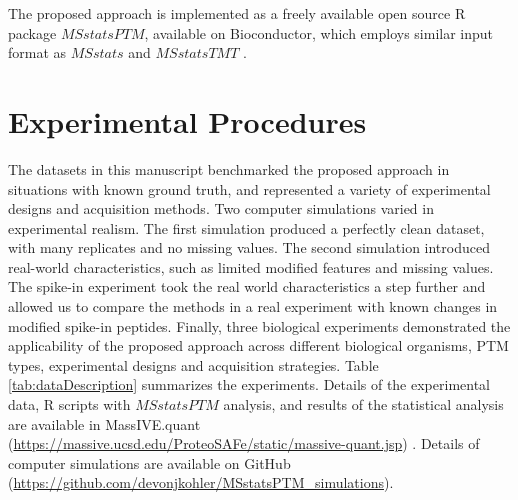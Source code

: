 \documentclass[mcp]{article}
\numberwithin{table}{section}
\begin{document}
The proposed approach is implemented as a freely available open source R package $MSstatsPTM$, available on Bioconductor, which employs similar input format as $MSstats$ and $MSstatsTMT$ \cite{Choi:2014,Huang:2020}.

\section{Experimental Procedures}

The datasets in this manuscript  benchmarked the proposed approach in situations with known ground truth, and represented a variety of experimental designs and acquisition methods. Two computer simulations varied in experimental realism. The first simulation produced a perfectly clean dataset, with many replicates and no missing values. The second simulation introduced real-world characteristics, such as limited modified features and missing values. The spike-in experiment took the real world characteristics a step further and allowed us to compare the methods in a real experiment with known changes in modified spike-in peptides. Finally, three biological experiments demonstrated the applicability of the proposed approach across different biological organisms, PTM types, experimental designs and acquisition strategies. Table \ref{tab:dataDescription} summarizes the experiments. Details of the experimental data, R scripts with $MSstatsPTM$ analysis, and results of the statistical analysis are available in MassIVE.quant (\url{https://massive.ucsd.edu/ProteoSAFe/static/massive-quant.jsp}) \cite{Choi:2020}. Details of computer simulations are available on GitHub (\url{https://github.com/devonjkohler/MSstatsPTM_simulations}).
\end{document}

